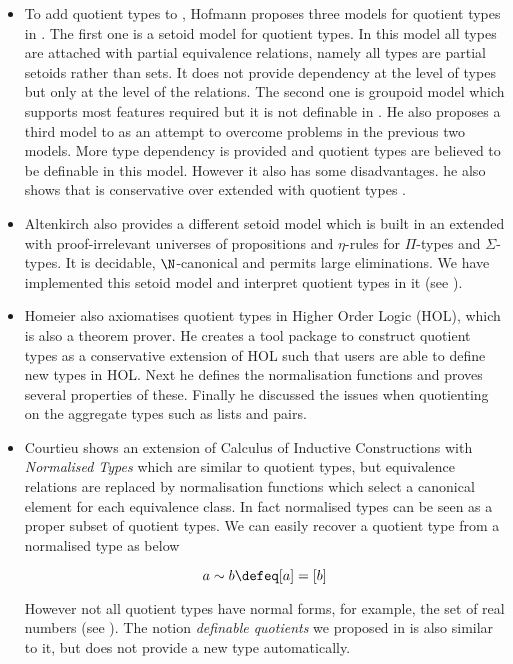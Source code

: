 \begin{itemize}
\item To add quotient types to \mltt, Hofmann proposes three models for
quotient types in \cite{hof:phd}. The first one is a setoid model for
quotient types. In this model all types are attached with partial
equivalence relations, namely all types are partial setoids rather than
sets. It does not provide dependency at the level of types but only at the level of the relations. 
The second one is groupoid model which supports most features required 
but it is not definable in \itt. 
He also proposes a third model to as an attempt to overcome problems in the previous two models. More type dependency is provided and quotient types are believed to be definable in this model.
However it also has some disadvantages. 
he also shows that \ett is conservative over \itt extended with quotient types \cite{hof:95:con}.


\item Altenkirch \cite{alti:lics99} also provides a different setoid model which is built in an \itt
extended with proof-irrelevant universes of propositions and $\eta$-rules for $\Pi$-types and $\Sigma$-types. It is decidable, $\N$-canonical and permits large eliminations. We have implemented this setoid model and interpret quotient types in it (see ).

\item Homeier \cite{hom} also axiomatises quotient types in Higher Order Logic
(HOL), which is also a theorem prover. He creates a tool package to
construct quotient types as a conservative extension of HOL such that
users are able to define new types in HOL. Next he defines the
normalisation functions and proves several properties of
these. Finally he discussed the issues when quotienting on the
aggregate types such as lists and pairs.


\item Courtieu \cite{cou:01} shows an extension of Calculus of Inductive Constructions
with \emph{Normalised Types} which are similar to quotient types, but equivalence relations are replaced by normalisation functions which select a canonical element for each equivalence class. 
In fact normalised types can be seen as a proper subset of quotient types. We can easily recover a quotient type from a normalised type as below

$$a \sim b \defeq [ a ] = [ b ]$$

However not all quotient types have normal forms, for example, the set of real numbers (see ).
The notion \emph{definable quotients} we proposed in  is also similar to it, but does not provide a new type automatically.


\end{itemize}
